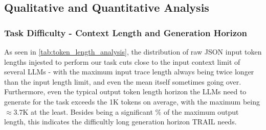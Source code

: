 \documentclass[11pt]{article}
\begin{document}

\subsection{Qualitative and Quantitative Analysis}
\label{subsec:qual_quant_analysis}


\subsubsection{Task Difficulty - Context Length and Generation Horizon}
\label{subsubsec:input_output_context_lengths}
As seen in \autoref{tab:token_length_analysis}, the distribution of raw JSON input token lengths injested to perform our task cuts close to the input context limit of several LLMs - with the maximum input trace length always being twice longer than the input length limit, and even the mean itself sometimes going over. Furthermore, even the typical output token length horizon the LLMs need to generate for the task exceeds the 1K tokens on average, with the maximum being $\approx$3.7K at the least. Besides being a significant \% of the maximum output length, this indicates the difficultly long generation horizon TRAIL needs.

\begin{table}[!ht]
\centering
{}
\caption{Input Context Lengths and Human-Annotated Output Token Lengths Across both GAIA and SWEBench Tasks and various SOTA models and their tokenizers. Input Length aggregates that exceed the limit are \textbf{highlighted}.}
\label{tab:token_length_analysis}
\end{table}
\end{document}
